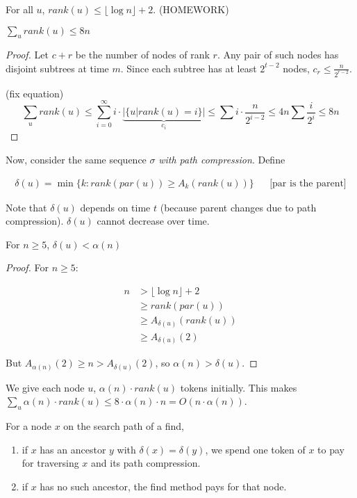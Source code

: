 \begin{mycorollary}
For all $u$, ${rank}(u) \le \lfloor \log n \rfloor + 2$. (HOMEWORK)
\end{mycorollary}

\begin{mylemma}
$\sum\limits_{u} {rank}(u) \le 8n$
\end{mylemma}
\begin{proof}
Let $c+r$ be the number of nodes of rank $r$. Any pair of such nodes has disjoint subtrees at time $m$. Since each subtree has at least $2^{t-2}$ nodes, $c_r \le \frac{n}{2^{r-2}}$.

(fix equation)
$$\sum\limits_{u} {rank}(u) \le \sum\limits_{i=0}^\infty i \cdot \underbrace{|\{u | {rank}(u) = i\}|}_{c_i} \le \sum i \cdot \frac{n}{2^{i-2}} \le 4n \sum \frac{i}{2^i} \le 8n$$

\end{proof}

Now, consider the same sequence $\sigma$ \emph{with path compression}. Define

\begin{align*}
\delta(u) = \min \{k : {rank}({par}(u)) \ge A_k({rank}(u)) \} && \text{[par is the parent]}
\end{align*}

Note that $\delta(u)$ depends on time $t$ (because parent changes due to path compression). $\delta(u)$ cannot decrease over time.

\begin{mylemma}
For $n \ge 5$, $\delta(u) < \alpha(n)$
\end{mylemma}
\begin{proof}
For $n \ge 5$:

\begin{align*}
n &> \lfloor \log n \rfloor + 2 \\
& \ge {rank}({par}(u)) \\
& \ge A_{\delta(u)}({rank}(u)) \\
& \ge A_{\delta(u)}(2)
\end{align*}

But $A_{\alpha(n)} (2) \ge n > A_{\delta(u)}(2)$, so $\alpha(n) > \delta(u)$.
\end{proof}

We give each node $u$, $\alpha(n) \cdot {rank}(u)$ tokens initially. This makes $\sum_u \alpha(n) \cdot {rank}(u) \le 8 \cdot \alpha(n) \cdot n = O(n \cdot \alpha(n))$.

For a node $x$ on the search path of a find,
\begin{enumerate}
\item if $x$ has an ancestor $y$ with $\delta(x) = \delta(y)$, we spend one token of $x$ to pay for traversing $x$ and its path compression.
\item if $x$ has no such ancestor, the find method pays for that node.
\end{enumerate}

